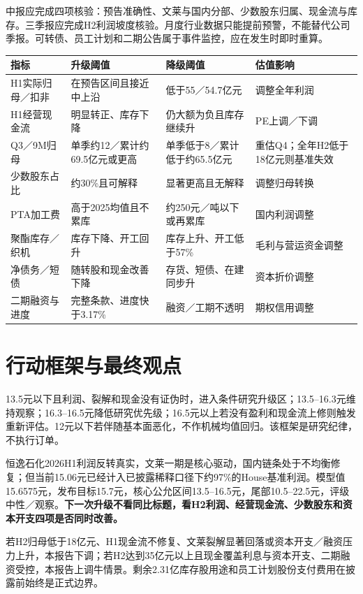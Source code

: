 中报应完成四项核验：预告准确性、文莱与国内分部、少数股东归属、现金流与库存。三季报应完成H2利润坡度核验。月度行业数据只能提前预警，不能替代公司季报。可转债、员工计划和二期公告属于事件监控，应在发生时即时重算。

\begin{exhibitbox}[核心监控阈值]
\noindent\begin{tabularx}{\textwidth}{L{3.1cm}L{2.75cm}L{2.75cm}X}
\toprule
\textbf{指标} & \textbf{升级阈值} & \textbf{降级阈值} & \textbf{估值影响} \\
\midrule
H1实际归母／扣非 & 在预告区间且接近中上沿 & 低于55／54.7亿元 & 调整全年利润 \\
H1经营现金流 & 明显转正、库存下降 & 仍大额为负且库存继续升 & PE上调／下调 \\
Q3／9M归母 & 单季约12／累计约69.5亿元或更高 & 单季低于8／累计低于约65.5亿元 & 重估Q4；全年H2低于18亿元则基准失效 \\
少数股东占比 & 约30\%且可解释 & 显著更高且无解释 & 调整归母转换 \\
PTA加工费 & 高于2025均值且不累库 & 约250元／吨以下或再累库 & 国内利润调整 \\
聚酯库存／织机 & 库存下降、开工回升 & 库存上升、开工低于57\% & 毛利与营运资金调整 \\
净债务／短债 & 随转股和现金改善下降 & 存货、短债、在建同步升 & 资本折价调整 \\
二期融资与进度 & 完整条款、进度快于3.17\% & 融资／工期不透明 & 期权信用调整 \\
\bottomrule
\end{tabularx}
\end{exhibitbox}

\section{行动框架与最终观点}

13.5元以下且利润、裂解和现金没有证伪时，进入条件研究升级区；13.5--16.3元维持观察；16.3--16.5元降低研究优先级；16.5元以上若没有盈利和现金流上修则触发重新评估。12元以下若伴随基本面恶化，不作机械均值回归。该框架是研究纪律，不执行订单。

\begin{houseviewbox}[最终投资结论]
恒逸石化2026H1利润反转真实，文莱一期是核心驱动，国内链条处于不均衡修复；但当前15.06元已经计入已披露稀释口径下约97\%的House基准利润。模型值15.6575元，发布目标15.7元，核心公允区间13.5--16.5元，尾部10.5--22.5元，评级中性／观察。\textbf{下一次升级不看同比标题，看H2利润、经营现金流、少数股东和资本开支四项是否同时改善。}
\end{houseviewbox}

\begin{riskbox}[最终失效条件]
若H2归母低于18亿元、H1现金流不修复、文莱裂解显著回落或资本开支／融资压力上升，本报告下调；若H2达到35亿元以上且现金覆盖利息与资本开支、二期融资受控，本报告上调牛情景。剩余2.31亿库存股用途和员工计划股份支付费用在披露前始终是正式边界。
\end{riskbox}
